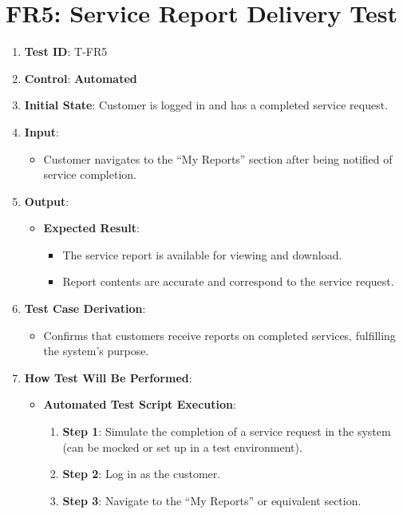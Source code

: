 \documentclass[12pt, titlepage]{article}
\begin{document}
\section*{FR5: Service Report Delivery Test}

\begin{enumerate}
    \item \textbf{Test ID}: T-FR5
    \item \textbf{Control}: \textbf{Automated}
    \item \textbf{Initial State}: Customer is logged in and has a completed service request.
    \item \textbf{Input}:
    \begin{itemize}
        \item Customer navigates to the ``My Reports'' section after being notified of service completion.
    \end{itemize}
    \item \textbf{Output}:
    \begin{itemize}
        \item \textbf{Expected Result}:
        \begin{itemize}
            \item The service report is available for viewing and download.
            \item Report contents are accurate and correspond to the service request.
        \end{itemize}
    \end{itemize}
    \item \textbf{Test Case Derivation}:
    \begin{itemize}
        \item Confirms that customers receive reports on completed services, fulfilling the system’s purpose.
    \end{itemize}
    \item \textbf{How Test Will Be Performed}:
    \begin{itemize}
        \item \textbf{Automated Test Script Execution}:
        \begin{enumerate}
            \item \textbf{Step 1}: Simulate the completion of a service request in the system (can be mocked or set up in a test environment).
            \item \textbf{Step 2}: Log in as the customer.
            \item \textbf{Step 3}: Navigate to the ``My Reports'' or equivalent section.

\end{enumerate}
\end{itemize}
\end{enumerate}
\end{document}
